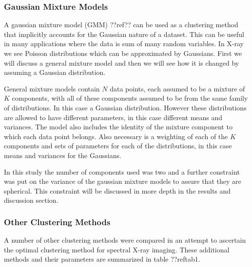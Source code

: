 \documentclass[a4paper,11pt]{article}
\begin{document}
\subsubsection{Gaussian Mixture Models}

A gaussian mixture model (GMM) ??ref?? can be used as a clustering method that implicitly accounts for the Gaussian nature of a dataset. This can be useful in many applications where the data is sum of many random variables. In X-ray we see Poisson distributions which can be approximated by Gaussians. First we will discuss a general mixture model and then we will see how it is changed by assuming a Gaussian distribution.

General mixture models contain $N$ data points, each assumed to be a mixture of $K$ components, with all of these components assumed to be from the same family of distributions. In this case a Gaussian distribution. However these distributions are allowed to have different parameters, in this case different means and variances. The model also includes the identity of the mixture component to which each data point belongs. Also necessary is a weighting of each of the $K$ components and sets of parameters for each of the distributions, in this case means and variances for the Gaussians.

In this study the number of components used was two and a further constraint was put on the variance of the gaussian mixture models to assure that they are spherical. This constraint will be discussed in more depth in the results and discussion section.

\subsubsection{Other Clustering Methods}

A number of other clustering methods were compared in an attempt to ascertain the optimal clustering method for spectral X-ray imaging. These additional methods and their parameters are summarized in table ??ref{tab1}.
\end{document}
